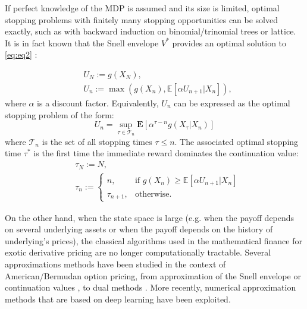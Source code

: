 \documentclass{article}
\begin{document}
\smallskip
If perfect knowledge of the MDP is assumed and its size is limited, optimal stopping problems with finitely many stopping opportunities can be solved exactly, such as with backward induction on binomial/trinomial trees or lattice. It is in fact known that the Snell envelope $V^{\ast}$ provides an optimal solution to \ref{eq:eq2} \citep{peskir2006optimal}:

\begin{equation}\label{eq:eq4}
\begin{split}
   &U_N := g(X_N),\\
   &U_n := \max (g(X_n), \mathbb{E}[\alpha U_{n+1} | X_n]),
\end{split}   
\end{equation}
where $\alpha$ is a discount factor. Equivalently, $U_n$ can be expressed as the optimal stopping problem of the form:
\begin{equation}\label{eq:eq5}
   U_n = \sup_{\tau \in \mathcal{T}_n} \mathbf{E}[\alpha^{\tau - n}g(X_{\tau}| X_n)]
\end{equation}
where $\mathcal{T}_n$ is the set of all stopping times $\tau \leq n$. The associated optimal stopping time $\tau^{\ast}$ is the first time the immediate reward dominates the continuation value:
\begin{equation}\label{eq:eq6}
\begin{split}
&\tau_N := N,\\
&\tau_n := \begin{cases} 
n, & \mbox{if } g(X_n) \geq \mathbb{E}[\alpha U_{n+1}| X_n] \\ 
\tau_{n+1}, & \mbox{otherwise.}  \end{cases}
\end{split}
\end{equation}

On the other hand, when the state space is large (e.g. when the payoff depends on several underlying assets or when the payoff depends on the history of underlying’s prices), the classical algorithms used in the mathematical finance for exotic derivative pricing are no longer computationally tractable. Several approximations methods have been studied in the context of American/Bermudan option pricing, from approximation of the Snell envelope or continuation values \citep{longstaff2001valuing, carriere1996valuation}, to dual methods \citep{haugh2004pricing}. More recently, numerical approximation methods that are based on deep learning have been exploited. 
\end{document}

